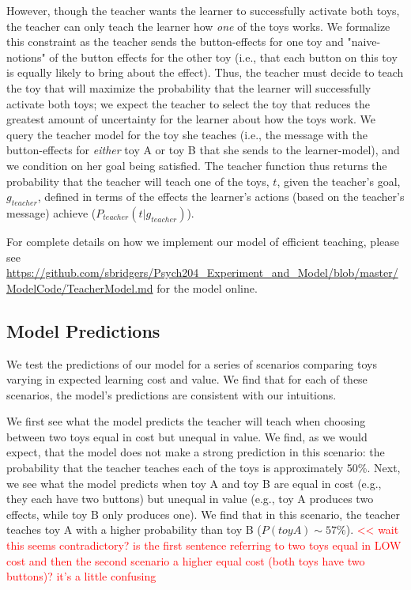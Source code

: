 \documentclass[10pt,letterpaper]{article}
\begin{document}
However, though the teacher wants the learner to successfully activate both toys, the teacher can only teach the learner how \textit{one} of the toys works. We formalize this constraint as the teacher sends the button-effects for one toy and "naive-notions" of the button effects for the other toy (i.e., that each button on this toy is equally likely to bring about the effect). Thus, the teacher must decide to teach the toy that will maximize the probability that the learner will successfully activate both toys; we expect the teacher to select the toy that reduces the greatest amount of uncertainty for the learner about how the toys work. We query the teacher model for the toy she teaches (i.e., the message with the button-effects for \textit{either} toy A or toy B that she sends to the learner-model), and we condition on her goal being satisfied. The teacher function thus returns the probability that the teacher will teach one of the toys, $t$, given the teacher's goal, $g_{teacher}$, defined in terms of the effects the learner's actions (based on the teacher's message) achieve ($P_{teacher}(t | g_{teacher})$).

For complete details on how we implement our model of efficient teaching, please see \url{https://github.com/sbridgers/Psych204_Experiment_and_Model/blob/master/ModelCode/TeacherModel.md} for the model online.

\subsection{Model Predictions}

We test the predictions of our model for a series of scenarios comparing toys varying in expected learning cost and value. We find that for each of these scenarios, the model's predictions are consistent with our intuitions. 

We first see what the model predicts the teacher will teach when choosing between two toys equal in cost but unequal in value. We find, as we would expect, that the model does not make a strong prediction in this scenario: the probability that the teacher teaches each of the toys is approximately 50\%. Next, we see what the model predicts when toy A and toy B are equal in cost (e.g., they each have two buttons) but unequal in value (e.g., toy A produces two effects, while toy B only produces one). We find that in this scenario, the teacher teaches toy A with a higher probability than toy B ($P(toyA) \sim 57\%$). \textcolor{red}{<< wait this seems contradictory? is the first sentence referring to two toys equal in LOW cost and then the second scenario a higher equal cost (both toys have two buttons)? it's a little confusing}
\end{document}
